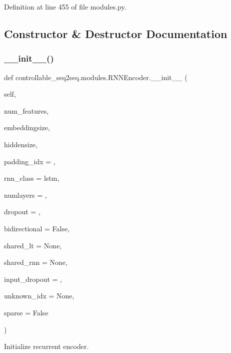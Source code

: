 Definition at line 455 of file modules.\+py.



\subsection{Constructor \& Destructor Documentation}
\mbox{\label{classcontrollable__seq2seq_1_1modules_1_1RNNEncoder_a3769fbcd25b4fca433ee27b17550e996}} 
\subsubsection{\texorpdfstring{\+\_\+\+\_\+init\+\_\+\+\_\+()}{\_\_init\_\_()}}
{\footnotesize\ttfamily def controllable\+\_\+seq2seq.\+modules.\+R\+N\+N\+Encoder.\+\_\+\+\_\+init\+\_\+\+\_\+ (\begin{DoxyParamCaption}\item[{}]{self,  }\item[{}]{num\+\_\+features,  }\item[{}]{embeddingsize,  }\item[{}]{hiddensize,  }\item[{}]{padding\+\_\+idx = {},  }\item[{}]{rnn\+\_\+class = {\ttfamily \textquotesingle{}lstm\textquotesingle{}},  }\item[{}]{numlayers = {},  }\item[{}]{dropout = {},  }\item[{}]{bidirectional = {\ttfamily False},  }\item[{}]{shared\+\_\+lt = {\ttfamily None},  }\item[{}]{shared\+\_\+rnn = {\ttfamily None},  }\item[{}]{input\+\_\+dropout = {},  }\item[{}]{unknown\+\_\+idx = {\ttfamily None},  }\item[{}]{sparse = {\ttfamily False} }\end{DoxyParamCaption})}

\begin{DoxyVerb}Initialize recurrent encoder.\end{DoxyVerb}
 

